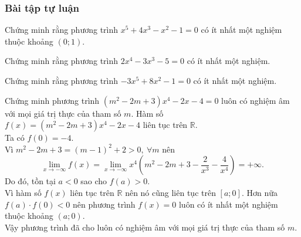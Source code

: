 \subsubsection{Bài tập tự luận}
\begin{bt}[NB]%
Chứng minh rằng phương trình $x^5+4x^3-x^2-1=0$ có ít nhất một nghiệm thuộc khoảng $(0;1)$.
\end{bt}
\begin{bt}[NB]%
		Chứng minh rằng phương trình $ 2x^4-3x^3-5=0 $ có ít nhất một nghiệm.
	\end{bt}
	\begin{bt}[TH]%
Chứng minh rằng phương trình $-3x^5+8x^2-1=0$ có ít nhất một nghiệm.
\end{bt}
\begin{bt}[TH]%
Chứng minh phương trình $\left(m^2-2m+3\right)x^4-2x-4=0$ luôn có nghiệm âm với mọi giá trị thực của tham số $m$.
\loigiai
{Hàm số $f(x)=\left(m^2-2m+3\right)x^4-2x-4$ liên tục trên $\mathbb{R}$.\\
Ta có $f(0)=-4$.\\
Vì $m^2-2m+3=(m-1)^2+2>0,\ \forall m$ nên $$\lim\limits_{x\to -\infty} f(x)=\lim\limits_{x\to -\infty} x^4\left(m^2-2m+3-\dfrac{2}{x^3}-\dfrac{4}{x^4}\right)=+\infty.$$
Do đó, tồn tại $a<0$ sao cho $f(a)>0$.\\
Vì hàm số $f(x)$ liên tục trên $\mathbb{R}$ nên nó cũng liên tục trên $[a; 0]$. Hơn nữa $f(a)\cdot f(0)<0$ nên phương trình $f(x)=0$ luôn có ít nhất một nghiệm thuộc khoảng $(a; 0)$.\\
Vậy phương trình đã cho luôn có nghiệm âm với mọi giá trị thực của tham số $m$.
}
\end{bt}

